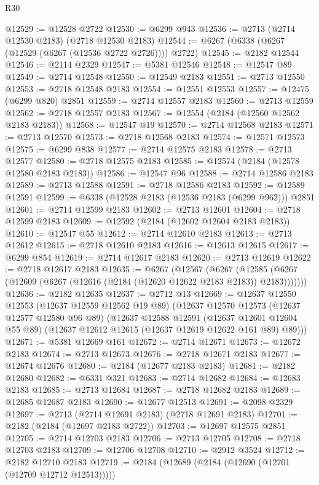 \begin{lexlean}{R30}
\begin{coremodule}
@12529 := @12528 @2722
@12530 := @6299 @943
@12536 := @2713 (@2714 @12530 @2183) (@2718 @12530 @2183)
@12544 := @6267 (@6338 (@6267 (@12529 (@6267 (@12536 @2722 @2726)))) @2722)
@12545 := @2182 @12544
@12546 := @2114 @2329
@12547 := @5381 @12546
@12548 := @12547 @89
@12549 := @2714 @12548
@12550 := @12549 @2183
@12551 := @2713 @12550
@12553 := @2718 @12548 @2183
@12554 := @12551 @12553
@12557 := @12475 (@6299 @820) @2851
@12559 := @2714 @12557 @2183
@12560 := @2713 @12559
@12562 := @2718 @12557 @2183
@12567 := @12554 (@2184 (@12560 @12562 @2183 @2183))
@12568 := @12547 @19
@12570 := @2714 @12568 @2183
@12571 := @2713 @12570
@12573 := @2718 @12568 @2183
@12574 := @12571 @12573
@12575 := @6299 @838
@12577 := @2714 @12575 @2183
@12578 := @2713 @12577
@12580 := @2718 @12575 @2183
@12585 := @12574 (@2184 (@12578 @12580 @2183 @2183))
@12586 := @12547 @96
@12588 := @2714 @12586 @2183
@12589 := @2713 @12588
@12591 := @2718 @12586 @2183
@12592 := @12589 @12591
@12599 := @6338 (@12528 @2183 (@12536 @2183 (@6299 @962))) @2851
@12601 := @2714 @12599 @2183
@12602 := @2713 @12601
@12604 := @2718 @12599 @2183
@12609 := @12592 (@2184 (@12602 @12604 @2183 @2183))
@12610 := @12547 @55
@12612 := @2714 @12610 @2183
@12613 := @2713 @12612
@12615 := @2718 @12610 @2183
@12616 := @12613 @12615
@12617 := @6299 @854
@12619 := @2714 @12617 @2183
@12620 := @2713 @12619
@12622 := @2718 @12617 @2183
@12635 := @6267
    (@12567
      (@6267 (@12585 (@6267 (@12609 (@6267 (@12616 (@2184 (@12620 @12622 @2183 @2183)) @2183)))))))
@12636 := @2182 @12635
@12637 := @2712 @13
@12669 := @12637
    @12550
    @12553
    (@12637 @12559 @12562 @19 @89)
    (@12637
      @12570
      @12573
      (@12637 @12577 @12580 @96 @89)
      (@12637
        @12588
        @12591
        (@12637 @12601 @12604 @55 @89)
        (@12637 @12612 @12615 (@12637 @12619 @12622 @161 @89) @89)))
@12671 := @5381 @12669 @161
@12672 := @2714 @12671
@12673 := @12672 @2183
@12674 := @2713 @12673
@12676 := @2718 @12671 @2183
@12677 := @12674 @12676
@12680 := @2184 (@12677 @2183 @2183)
@12681 := @2182 @12680
@12682 := @6331 @321
@12683 := @2714 @12682
@12684 := @12683 @2183
@12685 := @2713 @12684
@12687 := @2718 @12682 @2183
@12689 := @12685 @12687 @2183
@12690 := @12677 @12513
@12691 := @2098 @2329
@12697 := @2713 (@2714 @12691 @2183) (@2718 @12691 @2183)
@12701 := @2182 (@2184 (@12697 @2183 @2722))
@12703 := @12697 @12575 @2851
@12705 := @2714 @12703 @2183
@12706 := @2713 @12705
@12708 := @2718 @12703 @2183
@12709 := @12706 @12708
@12710 := @2912 @3524
@12712 := @2182 @12710 @2183
@12719 := @2184 (@12689 (@2184 (@12690 (@12701 (@12709 @12712 @12513)))))

\end{coremodule}
\end{lexlean}
